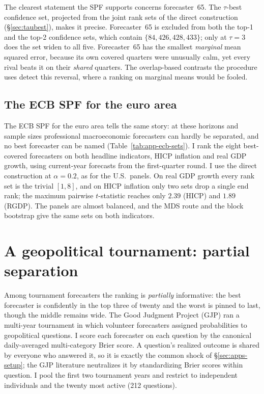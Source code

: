 \tabNgdp

The clearest statement the SPF supports concerns forecaster~65. The $\tau$-best
confidence set, projected from the joint rank sets of the direct construction
(\S\ref{sec:taubest}), makes it precise. Forecaster~65 is excluded from both the top-1
and the top-2 confidence sets, which contain $\{84, 426, 428, 433\}$; only at $\tau=3$
does the set widen to all five. Forecaster~65 has the smallest \emph{marginal} mean
squared error, because its own covered quarters were unusually calm, yet every rival
beats it on their \emph{shared} quarters. The overlap-based contrasts the procedure uses
detect this reversal, where a ranking on marginal means would be fooled.

\subsection{The ECB SPF for the euro area}
\label{sec:apps-ecb}

The ECB SPF for the euro area tells the same story: at these horizons and sample sizes
professional macroeconomic forecasters can hardly be separated, and no best forecaster
can be named (Table~\ref{tab:app-ecb-sets}). I rank the eight best-covered forecasters on
both headline indicators, HICP inflation and real GDP growth, using current-year
forecasts from the first-quarter round. I use the direct construction at $\alpha=0.2$,
as for the U.S.\ panels. On real GDP growth every rank set is the trivial $[1,8]$, and
on HICP inflation only two sets drop a single end rank; the maximum pairwise
$t$-statistic reaches only $2.39$ (HICP) and $1.89$ (RGDP). The panels are almost
balanced, and the MDS route and the block bootstrap give the same sets on both
indicators.

\section{A geopolitical tournament: partial separation}
\label{sec:apps-gjp}

Among tournament forecasters the ranking is \emph{partially} informative: the best
forecaster is confidently in the top three of twenty and the worst is pinned to last,
though the middle remains wide. The Good Judgment Project (GJP) ran a multi-year
tournament in which volunteer forecasters assigned probabilities to geopolitical
questions. I score each forecaster on each question by the canonical daily-averaged
multi-category Brier score. A question's realized outcome is shared by everyone who
answered it, so it is exactly the common shock of \S\ref{sec:apps-setup}; the GJP
literature neutralizes it by standardizing Brier scores within question. I pool the
first two tournament years and restrict to independent individuals and the twenty most
active (212 questions).

